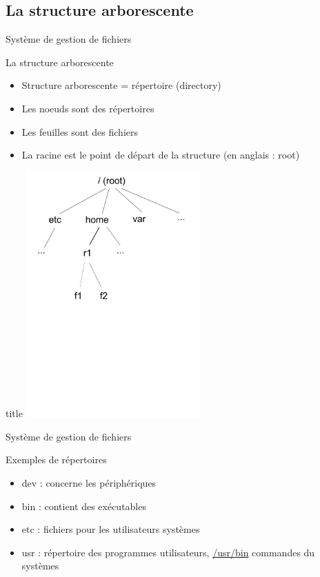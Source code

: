 \subsection{La structure arborescente}
\begin{frame}{Système de gestion de fichiers}
\begin{block}{La structure arborescente}
\begin{itemize}
\item Structure arborescente = répertoire (directory)
\item Les noeuds sont des répertoires
\item Les feuilles sont des fichiers
\item La racine est le point de départ de la structure (en anglais : root)
\end{itemize}
\end{block}

\begin{block}{title}
\includegraphics[width=0.5\textwidth]{CH02-IntroductionUnix/images/arbo.pdf}
\end{block}

\end{frame}

\begin{frame}{Système de gestion de fichiers}
\begin{block}{Exemples de répertoires}
\begin{itemize}
\item dev : concerne les périphériques
\item bin : contient des exécutables
\item etc : fichiers pour les utilisateurs systèmes
\item usr : répertoire des programmes utilisateurs, \url{/usr/bin} commandes du systèmes
\end{itemize}
\end{block}

\end{frame}


